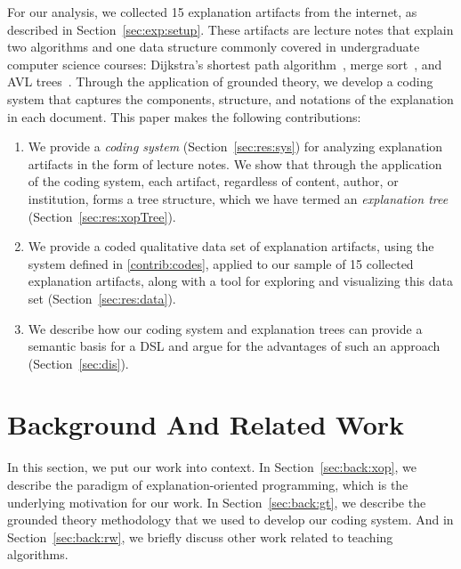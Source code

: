 \documentclass[sigconf]{acmart}
\begin{document}
For our analysis, we collected 15 explanation artifacts from the internet, as
described in Section~\ref{sec:exp:setup}. These artifacts are lecture notes
that explain two algorithms and one data structure commonly covered in
undergraduate computer science courses: Dijkstra's shortest path
algorithm~\cite[pp.~137--142]{KT06}, merge sort~\cite[210--214]{KT06}, and AVL
trees~\cite[pp.~458--475]{KnuthArt3}.
%
Through the application of grounded theory, we develop a coding system that
captures the components, structure, and notations of the explanation in each
document. This paper makes the following contributions:
%
\begin{enumerate}[label=C\arabic*.,ref=C\arabic*,leftmargin=*]


\item \label{contrib:codes}
%
We provide a \emph{coding system} (Section~\ref{sec:res:sys}) for analyzing
explanation artifacts in the form of lecture notes. We show that through the
application of the coding system, each artifact, regardless of content, author,
or institution, forms a tree structure, which we have termed an
\emph{explanation tree} (Section~\ref{sec:res:xopTree}).

\item \label{contrib:data}
%
We provide a coded qualitative data set of explanation artifacts, using the
system defined in \ref{contrib:codes}, applied to our sample of 15 collected
explanation artifacts, along with a tool for exploring and visualizing this
data set (Section~\ref{sec:res:data}).

\item \label{contrib:DSL}
%
We describe how our coding system and explanation trees can provide a semantic
basis for a DSL and argue for the advantages of such an approach
(Section~\ref{sec:dis}).
%
\end{enumerate}

\noindent

\section{Background And Related Work}
\label{sec:back}

In this section, we put our work into context.
%
In Section~\ref{sec:back:xop}, we describe the paradigm of explanation-oriented
programming, which is the underlying motivation for our work.
%
In Section~\ref{sec:back:gt}, we describe the grounded theory methodology that
we used to develop our coding system.
%
And in Section~\ref{sec:back:rw}, we briefly discuss other work related to
teaching algorithms.
\end{document}
